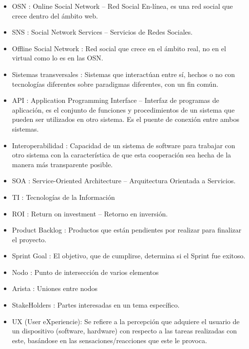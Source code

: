 \begin{itemize}
  \item OSN : Online Social Network – Red Social En-línea, es una red social que crece dentro del ámbito web.
  \item SNS : Social Network Services – Servicios de Redes Sociales.
  \item Offline Social Network : Red social que crece en el ámbito real, no en el virtual como lo es en las OSN.
  \item Sistemas transversales : Sistemas que interactúan entre sí, hechos o no con tecnologías diferentes sobre paradigmas diferentes, con un fin común.
  \item API : Application Programming Interface – Interfaz de programas de aplicación, es el conjunto de funciones y procedimientos de un sistema que pueden ser utilizados en otro sistema. Es el puente de conexión entre ambos sistemas.
  \item Interoperabilidad : Capacidad de un sistema de software para trabajar con otro sistema con la característica de que esta cooperación sea hecha de la manera más transparente posible.
  \item SOA : Service-Oriented Architecture – Arquitectura Orientada a Servicios.
  \item TI : Tecnologías de la Información
  \item ROI : Return on investment – Retorno en inversión.
  \item Product Backlog : Productos que están pendientes por realizar para finalizar el proyecto.
  \item Sprint Goal : El objetivo, que de cumplirse, determina si el Sprint fue exitoso.
  \item Nodo : Punto de intersección de varios elementos
  \item Arista : Uniones entre nodos
  \item StakeHolders : Partes interesadas en un tema específico.
  \item UX (User eXperiencie): Se refiere a la percepción que adquiere el usuario de un dispositivo (software, hardware) con respecto a las tareas realizadas con este, basándose en las sensaciones/reacciones que este le provoca.
\end{itemize}
